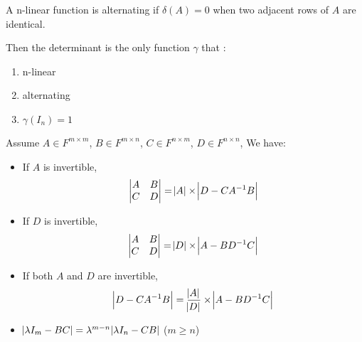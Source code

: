 \begin{definition}[alternating]
    A n-linear function is alternating if $\delta (A) = 0$ when two adjacent rows of $A$ are identical.
\end{definition}

Then the determinant is the only function $\gamma$ that :
\begin{enumerate}
    \item n-linear
    \item alternating
    \item $\gamma(I_n) = 1$
\end{enumerate}


\begin{theorem}
    Assume $A \in F^{m \times m}$, $B \in F^{m \times n}$, $C \in F^{n \times m}$, $D \in F^{n \times n}$, We have:
    \begin{itemize}
        \item If $A$ is invertible, \begin{equation}
            \begin{vmatrix}
                A & B \\
                C & D
                \end{vmatrix} = \abs{A} \times \abs{D - C {A}^{-1} B}
        \end{equation}
    \item If $D$ is invertible, \begin{equation}
            \begin{vmatrix}
                A & B \\
                C & D
                \end{vmatrix} = \abs{D} \times \abs{A - B {D}^{-1} C}
        \end{equation}
    \item If both $A$ and $D$ are invertible, \begin{equation}
        \abs{D - C {A}^{-1} B} = \frac{\abs{A}}{\abs{D}} \times \abs{A - B {D}^{-1} C}
        \end{equation}
    \item $\abs{\lambda I_m - BC} =\lambda^{m-n} \abs{\lambda I_n - CB}$ ($m \geq n$)
    \end{itemize}
\end{theorem}


